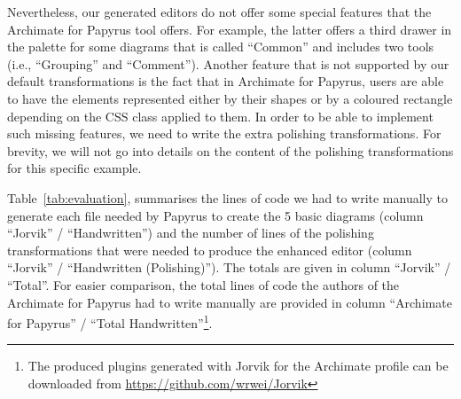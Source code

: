 Nevertheless, our generated editors do not offer some special features that the Archimate for Papyrus tool offers. 
For example, the latter offers a third drawer in the palette for some diagrams that is called ``Common'' and includes two tools (i.e., ``Grouping'' and ``Comment''). 
Another feature that is not supported by our default transformations is the fact that in Archimate for Papyrus, users are able to have the elements represented either by their shapes or by a coloured rectangle depending on the CSS class applied to them. 
In order to be able to implement such missing features, we need to write the extra polishing transformations. 
For brevity, we will not go into details on the content of the polishing transformations for this specific example.

Table~\ref{tab:evaluation}, summarises the lines of code we had to write manually to generate each file needed by Papyrus to create the 5 basic diagrams (column ``Jorvik'' / ``Handwritten'') and the number of lines of the polishing transformations that were needed to produce the enhanced editor (column ``Jorvik'' / ``Handwritten (Polishing)''). 
The totals are given in column ``Jorvik'' / ``Total''. 
For easier comparison, the total lines of code the authors of the Archimate for Papyrus had to write manually are provided in column ``Archimate for Papyrus'' / ``Total Handwritten''\footnote{The produced plugins generated with Jorvik for the Archimate profile can be downloaded from \url{https://github.com/wrwei/Jorvik}}.


